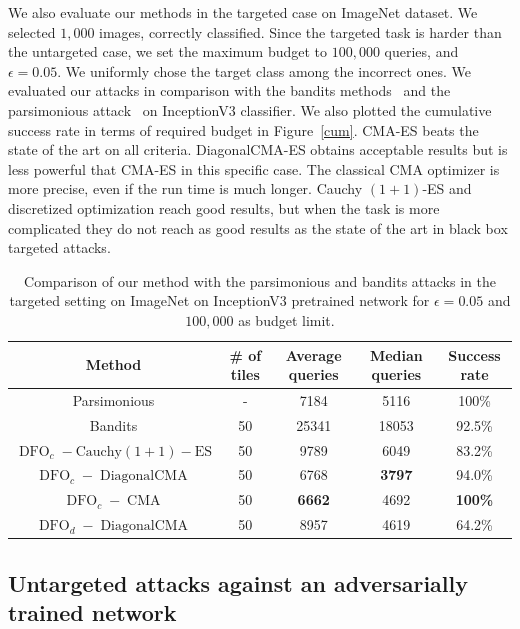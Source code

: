 We also evaluate our methods in the targeted case on ImageNet dataset. We selected $1,000$ images, correctly classified. Since the targeted task is harder than the untargeted case, we set the maximum budget to $100,000$ queries, and  $\epsilon=0.05$. We uniformly chose the target class among the incorrect ones. We evaluated our attacks in comparison with the bandits methods~\citep{ilyas2018prior} and the parsimonious attack~\citep{moon19aparsimonous} on InceptionV3 classifier. We also plotted the cumulative success rate in terms of required budget in Figure~\ref{cum}. CMA-ES beats the state of the art on all criteria. DiagonalCMA-ES obtains acceptable results but is less powerful that CMA-ES in this specific case. The classical CMA optimizer is more precise, even if the run time is much longer. Cauchy $(1+1)$-ES and discretized optimization reach good results, but when the task is more complicated they do not reach as good results as the state of the art in black box targeted attacks.
\begin{table}[t]
\caption{Comparison of our method with the parsimonious and bandits attacks in the targeted setting on ImageNet  on InceptionV3 pretrained network for $\epsilon=0.05$ and $100,000$ as budget limit.}
\label{targeted_comp}
\begin{center}
\begin{tabular}{cc|cc|c}
\textbf{Method} &\textbf{ \# of tiles }& \textbf{ Average queries} & \textbf{Median queries} & \textbf{Success rate}\\
 \hline
Parsimonious & - & 7184 &5116& 100\% \\
Bandits &50 &  25341&18053&92.5\% \\
\hline
$\operatorname{DFO}_c-\operatorname{Cauchy (1+1)-ES}$ &50 & 9789 & 6049& 83.2\% \\
$\operatorname{DFO}_c-\operatorname{Diagonal CMA}$& 50 & 6768& {\textbf{3797}} & 94.0\%\\
$\operatorname{DFO}_c-\operatorname{CMA}$& 50 & {\textbf{6662}} &4692& {\textbf{100\%}}\\
\hline
$\operatorname{DFO}_d-\operatorname{Diagonal CMA}$ & 50 & 8957 & 4619 & 64.2\%\\
\end{tabular}
\end{center}
\end{table}

\subsection{Untargeted attacks against an adversarially trained network}


